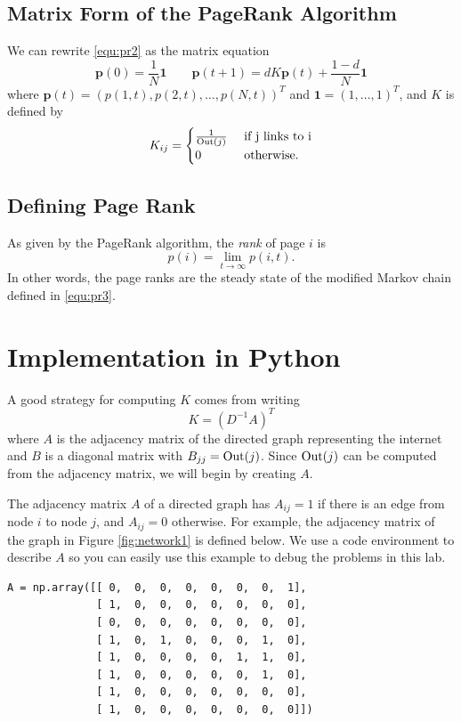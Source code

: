 \subsection*{Matrix Form of the PageRank Algorithm}
We can rewrite \eqref{equ:pr2} as the matrix equation
\begin{equation}\label{equ:pr3}
\mathbf{p}(0)=\frac{1}{N}\mathbf{1} \qquad \mathbf{p}(t+1) = dK\mathbf{p}(t) + \frac{1-d}{N}\mathbf{1}
\end{equation}
where $\mathbf{p}(t)=(p(1,t), p(2,t), \ldots, p(N,t))^T$ and $\mathbf{1} = (1,\ldots, 1)^T$, and $K$ is defined by
\[K_{ij} = \begin{cases} \frac{1}{\operatorname{Out}(j)} & \mbox{ if j links to i} \\
	0 & \mbox{ otherwise.} \end{cases}\]


\subsection*{Defining Page Rank}
As given by the PageRank algorithm, the \emph{rank} of page $i$ is
\[p(i) = \lim_{t\to \infty} p(i,t).\]
In other words, the page ranks are the steady state of the modified Markov chain defined in \eqref{equ:pr3}.



\section*{Implementation in Python}
A good strategy for computing $K$ comes from writing
\[
K = (D^{-1}A)^T
\]
where $A$ is the adjacency matrix of the directed graph representing the internet and $B$ is a diagonal matrix with $B_{jj}=\operatorname{Out}(j)$.
Since $\operatorname{Out}(j)$ can be computed from the adjacency matrix, we will begin by creating $A$.

The adjacency matrix $A$ of a directed graph has $A_{ij}=1$ if there is an edge from node $i$ to node $j$, and $A_{ij}=0$ otherwise.
For example, the adjacency matrix of the graph in Figure \ref{fig:network1} is defined below.
We use a code environment to describe $A$ so you can easily use this example to debug the problems in this lab.
\begin{lstlisting}
A = np.array([[ 0,  0,  0,  0,  0,  0,  0,  1],
              [ 1,  0,  0,  0,  0,  0,  0,  0],
              [ 0,  0,  0,  0,  0,  0,  0,  0],
              [ 1,  0,  1,  0,  0,  0,  1,  0],
              [ 1,  0,  0,  0,  0,  1,  1,  0],
              [ 1,  0,  0,  0,  0,  0,  1,  0],
              [ 1,  0,  0,  0,  0,  0,  0,  0],
              [ 1,  0,  0,  0,  0,  0,  0,  0]])
\end{lstlisting}



